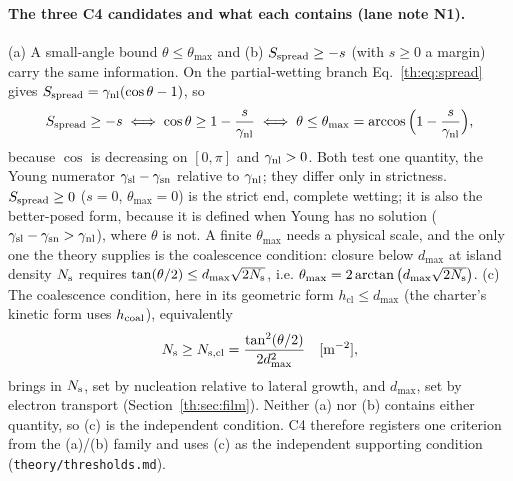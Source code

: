 \paragraph{The three C4 candidates and what each contains (lane note N1).} (a) A small-angle bound
$\theta\le\theta_\mathrm{max}$ and (b) $S_\mathrm{spread}\ge-s$ (with $s\ge0$ a margin) carry the same
information. On the partial-wetting branch Eq.~\eqref{th:eq:spread} gives $S_\mathrm{spread}=\gamma_\mathrm{nl}(\cos\theta-1)$,
so
\begin{equation}\label{th:eq:n1}
S_\mathrm{spread}\ge-s\iff\cos\theta\ge1-\frac{s}{\gamma_\mathrm{nl}}\iff\theta\le\theta_\mathrm{max}=\arccos\Big(1-\frac{s}{\gamma_\mathrm{nl}}\Big),
\end{equation}
because $\cos$ is decreasing on $[0,\pi]$ and $\gamma_\mathrm{nl}>0$. Both test one quantity, the Young
numerator $\gamma_\mathrm{sl}-\gamma_\mathrm{sn}$ relative to $\gamma_\mathrm{nl}$; they differ only in strictness. $S_\mathrm{spread}\ge0$ ($s=0$,
$\theta_\mathrm{max}=0$) is the strict end, complete wetting; it is also the better-posed form,
because it is defined when Young has no solution ($\gamma_\mathrm{sl}-\gamma_\mathrm{sn}>\gamma_\mathrm{nl}$), where $\theta$ is not. A
finite $\theta_\mathrm{max}$ needs a physical scale, and the only one the theory supplies is the
coalescence condition: closure below $d_\mathrm{max}$ at island density $N_\mathrm{s}$ requires
$\tan(\theta/2)\le d_\mathrm{max}\sqrt{2N_\mathrm{s}}$, i.e. $\theta_\mathrm{max}=2\arctan\big(d_\mathrm{max}\sqrt{2N_\mathrm{s}}\big)$.
(c) The coalescence condition, here in its geometric form $h_\mathrm{cl}\le d_\mathrm{max}$ (the
charter's kinetic form uses $h_\mathrm{coal}$), equivalently
\begin{equation}\label{th:eq:nclosure}
N_\mathrm{s}\ge N_\mathrm{s,cl}=\frac{\tan^{2}(\theta/2)}{2d_\mathrm{max}^{2}} \quad[\mathrm{m^{-2}}],
\end{equation}
brings in $N_\mathrm{s}$, set by nucleation relative to lateral growth, and $d_\mathrm{max}$, set by
electron transport (Section~\ref{th:sec:film}). Neither (a) nor (b) contains either quantity, so
(c) is the independent condition. C4 therefore registers one criterion from the (a)/(b) family
and uses (c) as the independent supporting condition (\texttt{theory/thresholds.md}).

